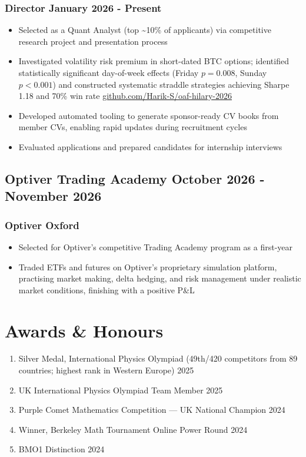 \documentclass[11pt]{article} %
\begin{document}
\subsubsection{Director \hfill  January 2026 - Present}
\begin{itemize}
\item Selected as a Quant Analyst (top \textasciitilde10\% of applicants) via competitive 
research project and presentation process
\item Investigated volatility risk premium in short-dated BTC options; identified 
statistically significant day-of-week effects (Friday $p=0.008$, Sunday $p<0.001$) and 
constructed systematic straddle strategies achieving Sharpe 1.18 and 70\% win rate \hfill \small\url{github.com/Harik-S/oaf-hilary-2026}
\item Developed automated tooling to generate sponsor-ready CV books from member CVs, 
enabling rapid updates during recruitment cycles
\item Evaluated applications and prepared candidates for internship interviews
\end{itemize}

\subsection{Optiver Trading Academy \hfill October 2026 - November 2026}
\subsubsection{Optiver \hfill Oxford}
\begin{itemize}
	\item Selected for Optiver's competitive Trading Academy program as a first-year
	\item Traded ETFs and futures on Optiver's proprietary simulation platform, practising 
	market making, delta hedging, and risk management under realistic market conditions, finishing with a positive P\&L
\end{itemize}

\section{Awards \& Honours}
\begin{enumerate}[label=\null, left=0pt..0pt, itemsep=0pt]
	\item Silver Medal, International Physics Olympiad (49th/420 competitors from 89 countries; highest rank in Western Europe) \hfill 2025
	\item UK International Physics Olympiad Team Member \hfill 2025
	\item Purple Comet Mathematics Competition — UK National Champion \hfill 2024
	\item Winner, Berkeley Math Tournament Online Power Round \hfill 2024
	\item BMO1 Distinction \hfill 2024
\end{enumerate}
\end{document}
